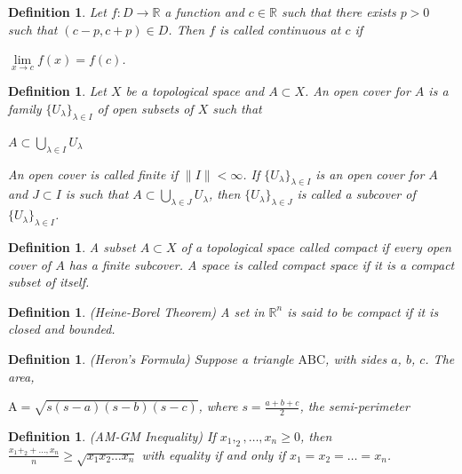 \documentclass[a4paper]{book}
\newtheorem{definition}[theorem]{Definition}%
\numberwithin{theorem}{section}%
\begin{document}
\begin{definition}
	Let $f:D\to\mathbb{R}$ a function and $c\in\mathbb{R}$ such that there exists $p>0$ such that $(c-p,c+p)\in D$. Then $f$ is called \textit{continuous} at $c$ if
	\begin{center}
		$\underset{x\to c}{\lim}f(x)=f(c)$.
	\end{center}
\end{definition}

\begin{definition}
    Let $X$ be a topological space and $A \subset X$. An open cover for $A$ is a family $\{U_\lambda\}_{\lambda\in I}$ of open subsets of $X$ such that
    \begin{center}
        $A \subset\underset{\lambda\in I}{\bigcup}{U_\lambda}$
    \end{center}
    An open cover is called finite if $\|I\|<\infty$. If $\{U_\lambda\}_{\lambda\in I}$ is an open cover for $A$ and $J \subset I$ is such that $A\subset\underset{\lambda\in J}{\bigcup}{U_\lambda}$, then $\{U_\lambda\}_{\lambda\in J}$ is called a subcover of $\{U_\lambda\}_{\lambda\in I}$.
\end{definition}

\begin{definition}
    A subset $A \subset X$ of a topological space called compact if every open cover of $A$ has a finite subcover. A space is called compact space if it is a compact subset of itself.
\end{definition}

\begin{definition} (Heine-Borel Theorem)
    A set in $\mathbb{R}^n$ is said to be compact if it is closed and bounded.
\end{definition}

\begin{definition} (Heron's Formula)
    Suppose a triangle $\mathrm{ABC}$, with sides $a$, $b$, $c$. The area,
    \begin{center}
        $\displaystyle \mathrm{A}=\sqrt{s(s-a)(s-b)(s-c)}$, where $s=\frac{a+b+c}{2}$, the semi-perimeter
    \end{center}
\end{definition}

\begin{definition} (AM-GM Inequality)
    If $x_1,_2,\ldots,x_n\geq0$, then $\displaystyle \frac{x_1+_2+\ldots,x_n}{n}\geq\sqrt{x_1 x_2 \ldots x_n}$ with equality if and only if $x_1=x_2=\ldots=x_n$.
\end{definition}
\end{document}
